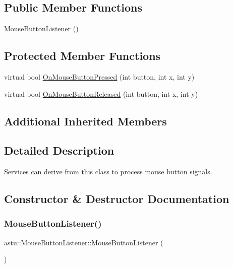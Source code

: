 \subsection*{Public Member Functions}
\begin{DoxyCompactItemize}
\item 
\hyperlink{classastu_1_1MouseButtonListener_aa03dca2d88ad2de23a5e61eb14ac614c}{Mouse\+Button\+Listener} ()
\end{DoxyCompactItemize}
\subsection*{Protected Member Functions}
\begin{DoxyCompactItemize}
\item 
virtual bool \hyperlink{classastu_1_1MouseButtonListener_abc95fea12cbecf9f8fc1f7ede14860e7}{On\+Mouse\+Button\+Pressed} (int button, int x, int y)
\item 
virtual bool \hyperlink{classastu_1_1MouseButtonListener_a14a97354c4f009c5f91f9877e00cef49}{On\+Mouse\+Button\+Released} (int button, int x, int y)
\end{DoxyCompactItemize}
\subsection*{Additional Inherited Members}


\subsection{Detailed Description}
Services can derive from this class to process mouse button signals. 

\subsection{Constructor \& Destructor Documentation}
\mbox{\label{classastu_1_1MouseButtonListener_aa03dca2d88ad2de23a5e61eb14ac614c}} 
\subsubsection{\texorpdfstring{Mouse\+Button\+Listener()}{MouseButtonListener()}}
{\footnotesize\ttfamily astu\+::\+Mouse\+Button\+Listener\+::\+Mouse\+Button\+Listener (\begin{DoxyParamCaption}{ }\end{DoxyParamCaption})\hspace{0.3cm}{\ttfamily [inline]}}

